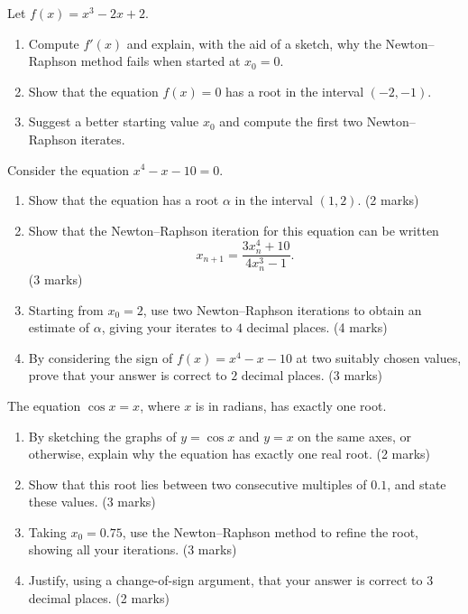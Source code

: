 \documentclass[11pt]{article}
\newcounter{popsec}
\newcounter{popsub}
\newcommand{\courssub}[1]{%
  \stepcounter{popsub}%
  \par\vspace{9pt}\noindent{\popxbold\fontsize{11.5}{13}\selectfont\color{popink}{\color{poporange}\thepopsec.\thepopsub}\hspace{6pt}#1}\par\nopagebreak\vspace{4pt}
}
\begin{document}
\begin{exercice}
Let $f(x) = x^{3} - 2x + 2$.
\begin{enumerate}
\item Compute $f'(x)$ and explain, with the aid of a sketch, why the Newton--Raphson method fails when started at $x_{0} = 0$.
\item Show that the equation $f(x) = 0$ has a root in the interval $(-2, -1)$.
\item Suggest a better starting value $x_{0}$ and compute the first two Newton--Raphson iterates.
\end{enumerate}
\end{exercice}

\courssub{I prepare for the GCE}

\begin{exercice}
Consider the equation $x^{4} - x - 10 = 0$.
\begin{enumerate}
\item Show that the equation has a root $\alpha$ in the interval $(1, 2)$. \hfill (2 marks)
\item Show that the Newton--Raphson iteration for this equation can be written
\[ x_{n+1} = \frac{3x_{n}^{4} + 10}{4x_{n}^{3} - 1}. \] \hfill (3 marks)
\item Starting from $x_{0} = 2$, use two Newton--Raphson iterations to obtain an estimate of $\alpha$, giving your iterates to $4$ decimal places. \hfill (4 marks)
\item By considering the sign of $f(x) = x^{4} - x - 10$ at two suitably chosen values, prove that your answer is correct to $2$ decimal places. \hfill (3 marks)
\end{enumerate}
\end{exercice}

\begin{exercice}[GCE-style: $\cos x = x$ \hfill (10 marks)]
The equation $\cos x = x$, where $x$ is in radians, has exactly one root.
\begin{enumerate}
\item By sketching the graphs of $y = \cos x$ and $y = x$ on the same axes, or otherwise, explain why the equation has exactly one real root. \hfill (2 marks)
\item Show that this root lies between two consecutive multiples of $0.1$, and state these values. \hfill (3 marks)
\item Taking $x_{0} = 0.75$, use the Newton--Raphson method to refine the root, showing all your iterations. \hfill (3 marks)
\item Justify, using a change-of-sign argument, that your answer is correct to $3$ decimal places. \hfill (2 marks)
\end{enumerate}
\end{exercice}
\end{document}

